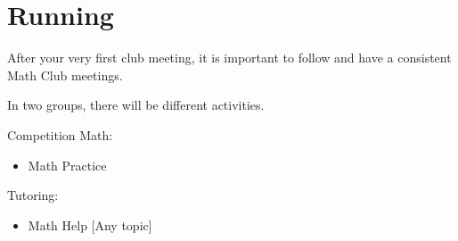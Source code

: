 \chapter{Running}

After your very first club meeting, 
it is important to follow and have a consistent Math Club meetings.

In two groups, there will be different activities.

\noindent
Competition Math:
\begin{itemize}
    \item Math Practice
\end{itemize}

\noindent
Tutoring:
\begin{itemize}
    \item Math Help [Any topic]
\end{itemize}


